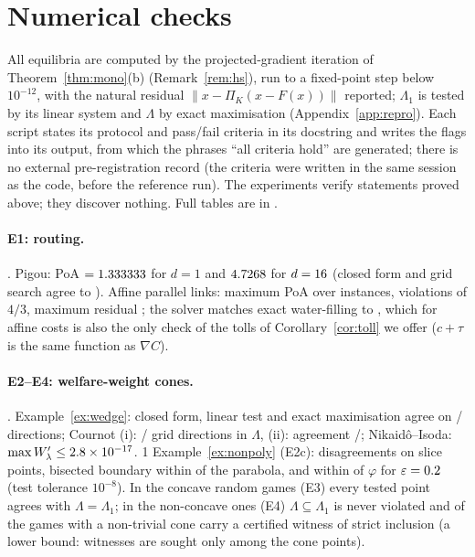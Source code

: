 \documentclass[11pt,a4paper]{article}
\providecommand{\HasNP}{0}
\theoremstyle{plain}
\theoremstyle{definition}
\theoremstyle{remark}
\newcommand{\Lam}{\Lambda}
\newcommand{\Lone}{\Lambda_{1}}
\begin{document}
\section{Numerical checks}\label{sec:exp}

All equilibria are computed by the projected-gradient iteration of Theorem~\ref{thm:mono}(b) (Remark~\ref{rem:hs}), run to a fixed-point step below $10^{-12}$, with the natural residual $\|x-\Pi_K(x-F(x))\|$ reported; $\Lone$ is tested by its linear system and $\Lam$ by exact maximisation (Appendix~\ref{app:repro}). Each script states its protocol and pass/fail criteria in its docstring and writes the flags into its output, from which the phrases ``all criteria hold'' are generated; there is no external pre-registration record (the criteria were written in the same session as the code, before the reference run). The experiments verify statements proved above; they discover nothing. Full tables are in .

\paragraph{E1: routing.} \CritTraffic. Pigou: PoA $=1.333333$ for $d=1$ and $4.7268$ for $d=16$ (closed form and grid search agree to \PigouGridGap). Affine parallel links: maximum PoA \AffPoAMax{} over \AffInstances{} instances, \AffViolations{} violations of $4/3$, maximum residual \AffMaxResidual; the solver matches exact water-filling to \AffMaxDevWaterfill, which for affine costs is also the only check of the tolls of Corollary~\ref{cor:toll} we offer ($c+\tau$ is the same function as $\nabla C$).

\paragraph{E2--E4: welfare-weight cones.} \CritWelfare. Example~\ref{ex:wedge}: closed form, linear test and exact maximisation agree on \TwoAgreement/\TwoAngles{} directions; Cournot (i): \CourIntInLambda/\CourIntGrid{} grid directions in $\Lam$, (ii): agreement \CourBdAgreement/\CourBdGrid; Nikaid\^o--Isoda: $\max W'_\lambda\le2.8\times 10^{-17}$. \if\HasNP1 Example~\ref{ex:nonpoly} (E2c): \NPmismatch{} disagreements on \NPslicePts{} slice points, bisected boundary within \NPbisDiff{} of the parabola, and within \NPsmPhiDiff{} of $\varphi$ for $\varepsilon=0.2$ (test tolerance $10^{-8}$). \fi In the \RndConcInst{} concave random games (E3) every tested point agrees with $\Lam=\Lone$; in the \RndNoncInst{} non-concave ones (E4) $\Lam\subseteq\Lone$ is never violated and \RndNoncWit{} of the \RndNoncNontriv{} games with a non-trivial cone carry a certified witness of strict inclusion (a lower bound: witnesses are sought only among the cone points).
\end{document}
